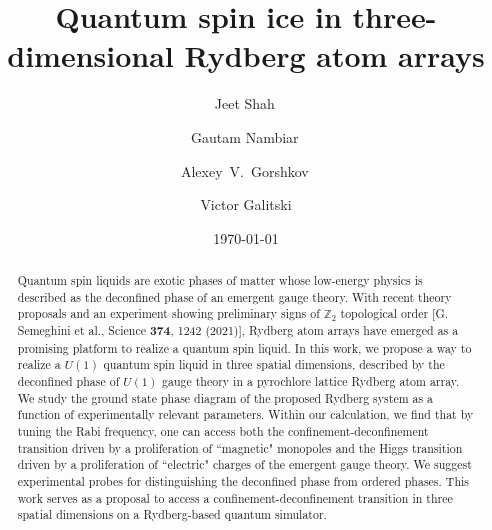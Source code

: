 \documentclass[twocolumn,superscriptaddress,amsmath,amssymb,aps,prx,nofootinbib]{revtex4-2}
\begin{document}
\title{Quantum spin ice in three-dimensional Rydberg atom arrays}

\author{Jeet Shah\,}
\author{Gautam Nambiar\,}
\author{Alexey~V.~Gorshkov\,}
\author{Victor Galitski}
\date{\today}


\begin{abstract}

  Quantum spin liquids are exotic phases of matter whose low-energy physics is described as the deconfined phase of an emergent gauge theory. With recent theory proposals and an experiment showing preliminary signs of $\mathbb{Z}_2$ topological order [G. Semeghini et al., Science \textbf{374}, 1242 (2021)], Rydberg atom arrays have emerged as a promising platform to realize a quantum spin liquid. In this work, we propose a way to realize a $U(1)$ quantum spin liquid in three spatial dimensions, described by the deconfined phase of $U(1)$ gauge theory in a pyrochlore lattice Rydberg atom array. We study the ground state phase diagram of the proposed Rydberg system as a function of experimentally relevant parameters. Within our calculation, we find that by tuning the Rabi frequency, one can access both the confinement-deconfinement transition driven by a proliferation of ``magnetic" monopoles and the Higgs transition driven by a proliferation of ``electric" charges of the emergent gauge theory. We suggest experimental probes for distinguishing the deconfined phase from ordered phases. This work serves as a proposal to access a confinement-deconfinement transition in three spatial dimensions on a Rydberg-based quantum simulator. 
  
\end{abstract}
\end{document}
